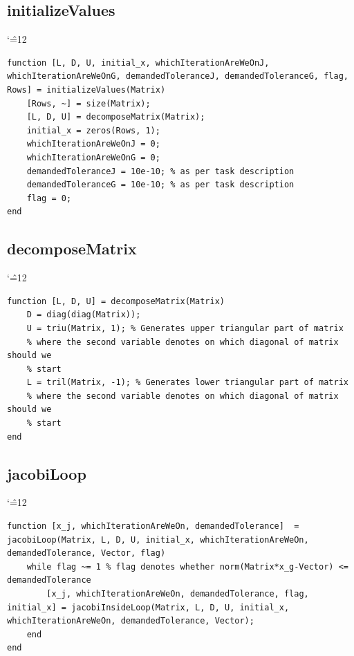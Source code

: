 \documentclass[12pt]{report}
\newenvironment{simplechar}{%
   \catcode`\^=12
}{}
\begin{document}
\subsection{initializeValues}
\begin{simplechar}
\begin{lstlisting}
function [L, D, U, initial_x, whichIterationAreWeOnJ, whichIterationAreWeOnG, demandedToleranceJ, demandedToleranceG, flag, Rows] = initializeValues(Matrix)
    [Rows, ~] = size(Matrix);
    [L, D, U] = decomposeMatrix(Matrix);
    initial_x = zeros(Rows, 1);
    whichIterationAreWeOnJ = 0;
    whichIterationAreWeOnG = 0;
    demandedToleranceJ = 10e-10; % as per task description
    demandedToleranceG = 10e-10; % as per task description
    flag = 0;
end
\end{lstlisting}
\end{simplechar}

\subsection{decomposeMatrix}
\begin{simplechar}
\begin{lstlisting}
function [L, D, U] = decomposeMatrix(Matrix)
    D = diag(diag(Matrix));
    U = triu(Matrix, 1); % Generates upper triangular part of matrix
    % where the second variable denotes on which diagonal of matrix should we
    % start
    L = tril(Matrix, -1); % Generates lower triangular part of matrix
    % where the second variable denotes on which diagonal of matrix should we
    % start
end
\end{lstlisting}
\end{simplechar}

\subsection{jacobiLoop}
\begin{simplechar}
\begin{lstlisting}
function [x_j, whichIterationAreWeOn, demandedTolerance]  = jacobiLoop(Matrix, L, D, U, initial_x, whichIterationAreWeOn, demandedTolerance, Vector, flag)
    while flag ~= 1 % flag denotes whether norm(Matrix*x_g-Vector) <= demandedTolerance
        [x_j, whichIterationAreWeOn, demandedTolerance, flag, initial_x] = jacobiInsideLoop(Matrix, L, D, U, initial_x, whichIterationAreWeOn, demandedTolerance, Vector);
    end
end
\end{lstlisting}
\end{simplechar}
\end{document}
